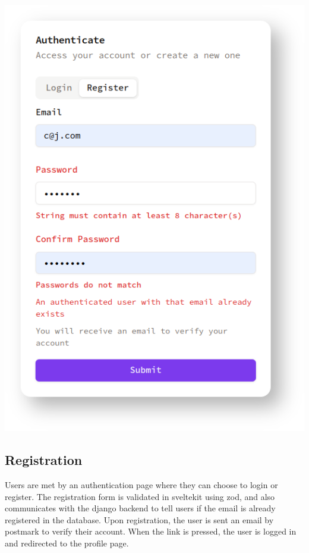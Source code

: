 \newpage
\begin{minipage}{0.46\textwidth} %
\includegraphics[width=\textwidth]{images/register.png} %
\end{minipage}
\hfill
\begin{minipage}{0.5\textwidth} %
\subsection{Registration}
    Users are met by an authentication page where they can choose to login or register. The registration form is validated in sveltekit using zod, and also communicates with the django backend to tell users if the email is already registered in the database. Upon registration, the user is sent an email by postmark to verify their account. When the link is pressed, the user is logged in and redirected to the profile page.
\end{minipage}

